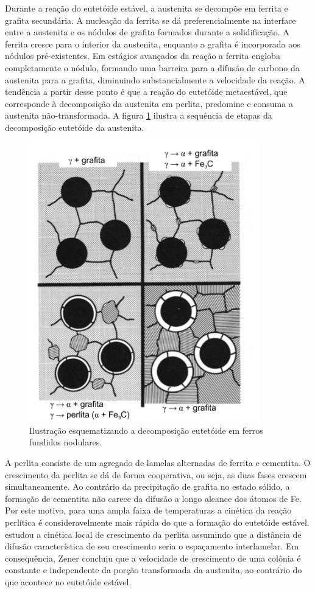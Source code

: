 Durante a reação do eutetóide estável, a austenita se decompõe em ferrita e grafita secundária. A nucleação da ferrita se dá preferencialmente na interface entre a austenita e os nódulos de grafita formados durante a solidificação. A ferrita cresce para o interior da austenita, enquanto a grafita é incorporada aos nódulos pré-existentes. Em estágios avançados da reação a ferrita engloba completamente o nódulo, formando uma barreira para a difusão de carbono da austenita para a grafita, diminuindo substancialmente a velocidade da reação. A tendência a partir desse ponto é que a reação do eutetóide metaestável, que corresponde à decomposição da austenita em perlita, predomine e consuma a austenita não-transformada. A figura \ref{matrizFofo} ilustra a sequência de etapas da decomposição eutetóide da austenita.

\begin{figure}
	\includegraphics[width=10cm]{img/matrizFofo.pdf}
	\caption{Ilustração esquematizando a decomposição eutetóide em ferros fundidos nodulares\cite{Johnson1978}.}
	\label{matrizFofo}
\end{figure}

A perlita consiste de um agregado de lamelas alternadas de ferrita e cementita. O crescimento da perlita se dá de forma cooperativa, ou seja, as duas fases crescem simultaneamente. Ao contrário da precipitação de grafita no estado sólido, a formação de cementita não carece da difusão a longo alcance dos átomos de Fe. Por este motivo, para uma ampla faixa de temperaturas a cinética da reação perlítica é consideravelmente mais rápida do que a formação do eutetóide estável.  estudou a cinética local de crescimento da perlita assumindo que a distância de difusão característica de seu crescimento seria o espaçamento interlamelar. Em consequência, Zener concluiu que a velocidade de crescimento de uma colônia é constante e independente da porção transformada da austenita, ao contrário do que acontece no eutetóide estável.

